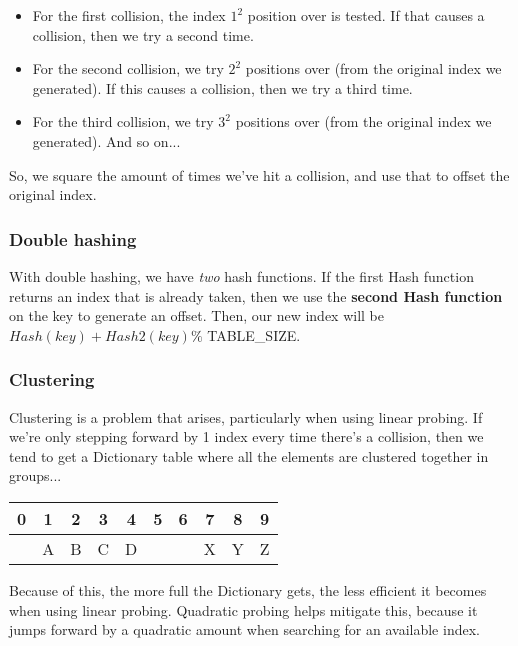 \documentclass[a4paper,12pt,oneside]{book}
\begin{document}
\begin{itemize}
    \item For the first collision, the index $1^{2}$ position over is tested. If
    that causes a collision, then we try a second time.

    \item For the second collision, we try $2^{2}$ positions over (from the original
    index we generated). If this causes a collision, then we try a third time.

    \item For the third collision, we try $3^{2}$ positions over (from the original
    index we generated). And so on...
\end{itemize}

So, we square the amount of times we've hit a collision, and use that
to offset the original index.

\subsubsection{Double hashing}

With double hashing, we have \textit{two} hash functions. If the first
Hash function returns an index that is already taken, then we
use the \textbf{second Hash function} on the key to generate an offset.
Then, our new index will be $Hash(key) + Hash2(key) \% $ TABLE\_SIZE.

\subsubsection{Clustering}

Clustering is a problem that arises, particularly when using linear probing.
If we're only stepping forward by 1 index every time there's a collision,
then we tend to get a Dictionary table where all the elements are clustered
together in groups...

\begin{center}
    \begin{tabular}{| c | c | c | c | c | c | c | c | c | c |}
        \hline
        0 & 1 & 2 & 3 & 4 & 5 & 6 & 7 & 8 & 9
        \\ \hline
        & A & B & C & D & & & X & Y & Z
        \\ \hline
    \end{tabular}
\end{center}

Because of this, the more full the Dictionary gets, the less efficient
it becomes when using linear probing. Quadratic probing helps mitigate this,
because it jumps forward by a quadratic amount when searching for an
available index.
\end{document}
